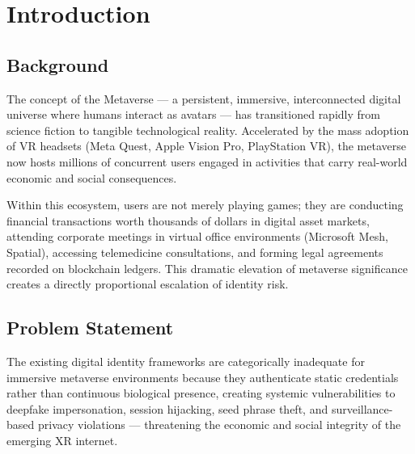 \documentclass[12pt,a4paper,oneside]{report}
\begin{document}
\chapter{Introduction}

\section{Background}
The concept of the Metaverse --- a persistent, immersive, interconnected digital universe where humans interact as avatars --- has transitioned rapidly from science fiction to tangible technological reality. Accelerated by the mass adoption of VR headsets (Meta Quest, Apple Vision Pro, PlayStation VR), the metaverse now hosts millions of concurrent users engaged in activities that carry real-world economic and social consequences.

Within this ecosystem, users are not merely playing games; they are conducting financial transactions worth thousands of dollars in digital asset markets, attending corporate meetings in virtual office environments (Microsoft Mesh, Spatial), accessing telemedicine consultations, and forming legal agreements recorded on blockchain ledgers. This dramatic elevation of metaverse significance creates a directly proportional escalation of identity risk.

\section{Problem Statement}
The existing digital identity frameworks are categorically inadequate for immersive metaverse environments because they authenticate static credentials rather than continuous biological presence, creating systemic vulnerabilities to deepfake impersonation, session hijacking, seed phrase theft, and surveillance-based privacy violations --- threatening the economic and social integrity of the emerging XR internet.
\end{document}
